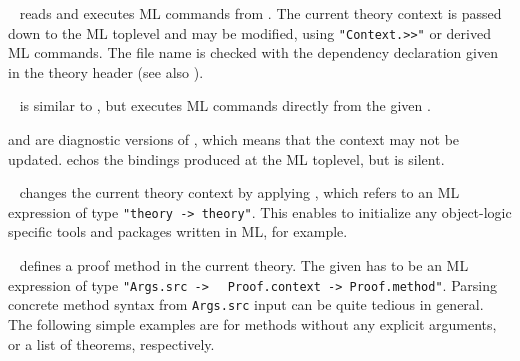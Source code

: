 \begin{isabellebody}
\begin{isamarkuptext}
  \begin{descr}

  \item [\mbox{\isa{\isacommand{use}}}~\isa{{\isachardoublequote}file{\isachardoublequote}}] reads and executes ML
  commands from .  The current theory context is passed
  down to the ML toplevel and may be modified, using \verb|"Context.>>"| or derived ML commands.  The file name is checked with
  the \mbox{} dependency declaration given in the theory
  header (see also ).
  
  \item [\mbox{\isa{\isacommand{ML}}}~\isa{{\isachardoublequote}text{\isachardoublequote}}] is similar to \mbox{}, but executes ML commands directly from the given .

  \item [\mbox{\isa{\isacommand{ML{\isacharunderscore}val}}} and \mbox{\isa{\isacommand{ML{\isacharunderscore}command}}}] are
  diagnostic versions of \mbox{}, which means that the context
  may not be updated.  \mbox{} echos the bindings produced
  at the ML toplevel, but \mbox{} is silent.
  
  \item [\mbox{\isa{\isacommand{setup}}}~\isa{{\isachardoublequote}text{\isachardoublequote}}] changes the current theory
  context by applying , which refers to an ML expression
  of type \verb|"theory -> theory"|.  This enables to initialize
  any object-logic specific tools and packages written in ML, for
  example.
  
  \item [\mbox{\isa{\isacommand{method{\isacharunderscore}setup}}}~\isa{{\isachardoublequote}name\ {\isacharequal}\ text\ description{\isachardoublequote}}]
  defines a proof method in the current theory.  The given  has to be an ML expression of type \verb|"Args.src ->|\isasep\isanewline%
\verb|  Proof.context -> Proof.method"|.  Parsing concrete method syntax
  from \verb|Args.src| input can be quite tedious in general.  The
  following simple examples are for methods without any explicit
  arguments, or a list of theorems, respectively.


\end{descr}
\end{isamarkuptext}
\end{isabellebody}
